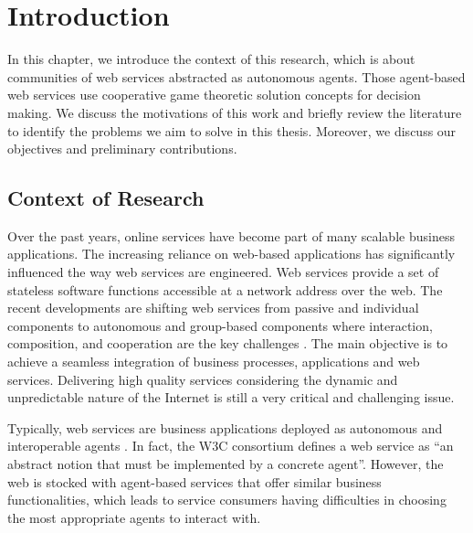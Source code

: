 %

\setcounter{chapter}{0}

\chapter{Introduction}\label{sec:intro}
In this chapter, we introduce the context of this research, which
is about communities of web services abstracted as autonomous
agents. Those agent-based web services use cooperative game
theoretic solution concepts for decision making. We discuss the
motivations of this work and briefly review the literature to
identify the problems we aim to solve in this thesis. Moreover, we
discuss our objectives and preliminary contributions.

\section{Context of Research}\label{sec:motivation}

Over the past years, online services have become part of many
scalable business applications. The increasing reliance on
web-based applications has significantly influenced the way web
services are engineered. Web services provide a set of stateless
software functions accessible at a network address over the web.
The recent developments are shifting web services from passive and
individual components to autonomous and group-based components
where interaction, composition, and cooperation are the key
challenges \cite{ICWS2011-1,SCC2011-1}. The main objective is to
achieve a seamless integration of business processes, applications
and web services. Delivering high quality services considering the
dynamic and unpredictable nature of the Internet is still a very
critical and challenging issue.

Typically, web services are business applications deployed as
autonomous and interoperable agents \cite{Alescio}. In fact, the
W3C consortium defines a web service as ``an abstract notion that
must be implemented by a concrete agent''. However, the web is
stocked with agent-based services that offer similar business
functionalities, which leads to service consumers having
difficulties in choosing the most appropriate agents to interact
with.

